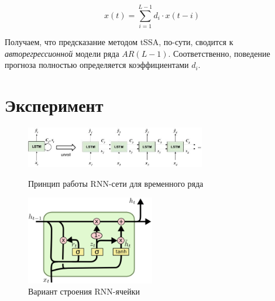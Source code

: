 	    	 \begin{equation*}\label{eq:autoregr}
	    	 	x(t) = \sum\limits_{i = 1}^{L - 1} d_i \cdot x(t - i)
	    	 \end{equation*}
	    	 
	    	 Получаем, что предсказание методом tSSA, по-сути, сводится к \textit{авторегрессионной} модели ряда $ AR(L - 1) $. Соответственно, поведение прогноза полностью определяется коэффициентами $ d_i $.
	    
	\section{Эксперимент}	
			
			\begin{figure}[h]
				\centering
				\includegraphics[width=0.7\textwidth, keepaspectratio]{../figs/lstm.jpg}
				\caption{Принцип работы RNN-сети для временного ряда}\label{pic:rnn_ilustr}
				\includegraphics[width=0.5\textwidth, keepaspectratio]{../figs/rnn_unit.png}
				\caption{Вариант строения RNN-ячейки}\label{pic:rnn_unit}
			\end{figure}
		
		\newpage
		\printbibliography
	
